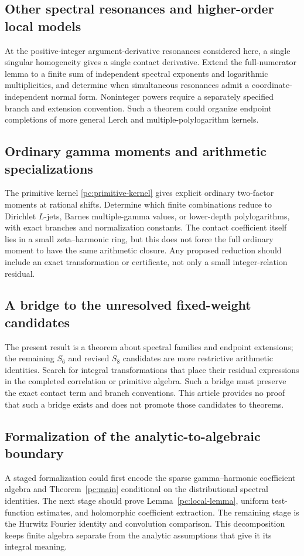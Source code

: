 \documentclass[11pt,a4paper]{article}
\numberwithin{equation}{section}
\theoremstyle{definition}
\begin{document}
\subsection{Other spectral resonances and higher-order local models}
At the positive-integer argument-derivative resonances considered here, a single singular homogeneity gives a single contact derivative. Extend the full-numerator lemma to a finite sum of independent spectral exponents and logarithmic multiplicities, and determine when simultaneous resonances admit a coordinate-independent normal form. Noninteger powers require a separately specified branch and extension convention. Such a theorem could organize endpoint completions of more general Lerch and multiple-polylogarithm kernels.

\subsection{Ordinary gamma moments and arithmetic specializations}
The primitive kernel \eqref{pc:primitive-kernel} gives explicit ordinary two-factor moments at rational shifts. Determine which finite combinations reduce to Dirichlet $L$-jets, Barnes multiple-gamma values, or lower-depth polylogarithms, with exact branches and normalization constants. The contact coefficient itself lies in a small zeta--harmonic ring, but this does not force the full ordinary moment to have the same arithmetic closure. Any proposed reduction should include an exact transformation or certificate, not only a small integer-relation residual.

\subsection{A bridge to the unresolved fixed-weight candidates}
The present result is a theorem about spectral families and endpoint extensions; the remaining $S_6$ and revised $S_8$ candidates are more restrictive arithmetic identities. Search for integral transformations that place their residual expressions in the completed correlation or primitive algebra. Such a bridge must preserve the exact contact term and branch conventions. This article provides no proof that such a bridge exists and does not promote those candidates to theorems.

\subsection{Formalization of the analytic-to-algebraic boundary}
A staged formalization could first encode the sparse gamma--harmonic coefficient algebra and Theorem~\ref{pc:main} conditional on the distributional spectral identities. The next stage should prove Lemma~\ref{pc:local-lemma}, uniform test-function estimates, and holomorphic coefficient extraction. The remaining stage is the Hurwitz Fourier identity and convolution comparison. This decomposition keeps finite algebra separate from the analytic assumptions that give it its integral meaning.
\end{document}
